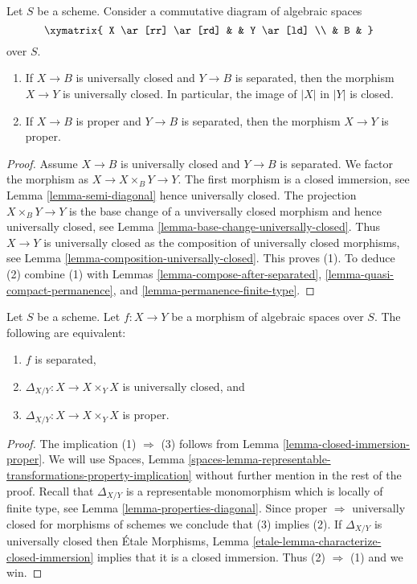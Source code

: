 \begin{lemma}
\label{lemma-universally-closed-permanence}
Let $S$ be a scheme.
Consider a commutative diagram of algebraic spaces
$$
\xymatrix{
X \ar[rr] \ar[rd] & &
Y \ar[ld] \\
& B &
}
$$
over $S$.
\begin{enumerate}
\item If $X \to B$ is universally closed and $Y \to B$ is
separated, then the morphism $X \to Y$ is universally closed.
In particular, the image of $|X|$ in $|Y|$ is closed.
\item If $X \to B$ is proper and $Y \to B$ is separated, then
the morphism $X \to Y$ is proper.
\end{enumerate}
\end{lemma}

\begin{proof}
Assume $X \to B$ is universally closed and $Y \to B$ is separated.
We factor the morphism as $X \to X \times_B Y \to Y$.
The first morphism is a closed immersion, see
Lemma \ref{lemma-semi-diagonal}
hence universally closed.
The projection $X \times_B Y \to Y$ is the base change
of a unviversally closed morphism and hence
universally closed, see
Lemma \ref{lemma-base-change-universally-closed}.
Thus $X \to Y$ is universally closed as the composition
of universally closed morphisms, see
Lemma \ref{lemma-composition-universally-closed}.
This proves (1). To deduce (2) combine (1) with
Lemmas \ref{lemma-compose-after-separated},
\ref{lemma-quasi-compact-permanence}, and
\ref{lemma-permanence-finite-type}.
\end{proof}

\begin{lemma}
\label{lemma-separated-diagonal-proper}
Let $S$ be a scheme.
Let $f : X \to Y$ be a morphism of algebraic spaces over $S$.
The following are equivalent:
\begin{enumerate}
\item $f$ is separated,
\item $\Delta_{X/Y} : X \to X \times_Y X$ is universally closed, and
\item $\Delta_{X/Y} : X \to X \times_Y X$ is proper.
\end{enumerate}
\end{lemma}

\begin{proof}
The implication (1) $\Rightarrow$ (3) follows from
Lemma \ref{lemma-closed-immersion-proper}.
We will use
Spaces, Lemma
\ref{spaces-lemma-representable-transformations-property-implication}
without further mention in the rest of the proof.
Recall that $\Delta_{X/Y}$ is a representable
monomorphism which is locally of finite type, see
Lemma \ref{lemma-properties-diagonal}.
Since proper $\Rightarrow$ universally closed for morphisms of schemes
we conclude that (3) implies (2).
If $\Delta_{X/Y}$ is universally closed then
\'Etale Morphisms,
Lemma \ref{etale-lemma-characterize-closed-immersion}
implies that it is a closed immersion. Thus (2) $\Rightarrow$ (1)
and we win.
\end{proof}






